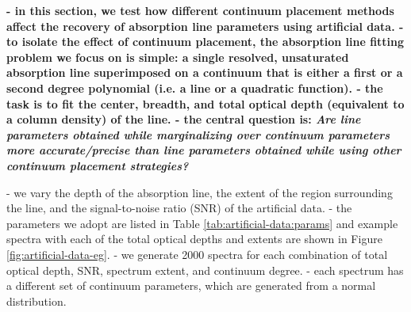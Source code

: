 \documentclass[trackchanges]{aastex62}
\begin{document}
{\color{red} \bf
- in this section, we test how different continuum placement methods affect the recovery of absorption line parameters using artificial data.
- to isolate the effect of continuum placement, the absorption line fitting problem we focus on is simple: a single resolved, unsaturated absorption line superimposed on a continuum that is either a first or a second degree polynomial (i.e. a line or a quadratic function).
- the task is to fit the center, breadth, and total optical depth (equivalent to a column density) of the line.
- the central question is: \emph{Are line parameters obtained while marginalizing over continuum parameters more accurate/precise than line parameters obtained while using other continuum placement strategies?}

- we vary the depth of the absorption line, the extent of the region surrounding the line, and the signal-to-noise ratio (SNR) of the artificial data.
- the parameters we adopt are listed in Table \ref{tab:artificial-data:params} and example spectra with each of the total optical depths and extents are shown in Figure \ref{fig:artificial-data-eg}.
- we generate 2000 spectra for each combination of total optical depth, SNR, spectrum extent, and continuum degree.
- each spectrum has a different set of continuum parameters, which are generated from a normal distribution.

}
\end{document}
